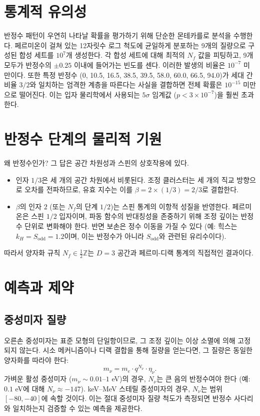 \documentclass[12pt,a4paper]{article}
\newcommand{\Sodd}{S_{\mathrm{odd}}}
\begin{document}
	\section{통계적 유의성}
	
	반정수 패턴이 우연히 나타날 확률을 평가하기 위해 단순한 몬테카를로 분석을 수행한다. 페르미온이 걸쳐 있는 12자릿수 로그 척도에 균일하게 분포하는 9개의 질량으로 구성된 합성 세트를 \(10^7\)개 생성한다. 각 합성 세트에 대해 최적의 \(N_f\) 값을 피팅하고, 9개 모두가 반정수의 \(\pm 0.25\) 이내에 들어가는 빈도를 센다. 이러한 발생의 비율은 \(10^{-7}\) 미만이다. 또한 특정 반정수 (0, 10.5, 16.5, 38.5, 39.5, 58.0, 60.0, 66.5, 94.0)가 세대 간 비율 \(3/2\)와 일치하는 엄격한 계층을 따른다는 사실을 결합하면 전체 확률은 \(10^{-15}\) 미만으로 떨어진다. 이는 입자 물리학에서 사용되는 \(5\sigma\) 임계값 (\(p < 3\times 10^{-7}\))을 훨씬 초과한다.
	
	\section{반정수 단계의 물리적 기원}
	
	왜 반정수인가? 그 답은 공간 차원성과 스핀의 상호작용에 있다.
	
	\begin{itemize}
		\item 인자 \(1/3\)은 세 개의 공간 차원에서 비롯된다. 조정 클러스터는 세 개의 직교 방향으로 오차를 전파하므로, 유효 지수는 이를 \(\beta = 2 \times (1/3) = 2/3\)로 결합한다.
		\item \(\beta\)의 인자 \(2\) (또는 \(N_f\)의 단계 \(1/2\))는 스핀 통계의 이항적 성질을 반영한다. 페르미온은 스핀 \(1/2\) 입자이며, 파동 함수의 반대칭성을 존중하기 위해 조정 깊이는 반정수 단위로 변화해야 한다. 반면 보손은 정수 이동을 가질 수 있다 (예: 힉스는 \(k_H = \Sodd = 1.2\)이며, 이는 반정수가 아니라 \(\Sodd\)와 관련된 유리수이다).
	\end{itemize}
	
	따라서 양자화 규칙 \(N_f \in \frac{1}{2}\mathbb{Z}\)는 \(D=3\) 공간과 페르미-디랙 통계의 직접적인 결과이다.
	
	\section{예측과 제약}
	
	\subsection{중성미자 질량}
	
	오른손 중성미자는 표준 모형의 단일항이므로, 그 조정 깊이는 이상 소멸에 의해 고정되지 않는다. 시소 메커니즘이나 디랙 결합을 통해 질량을 얻는다면, 그 질량은 동일한 양자화를 따라야 한다:
	\begin{equation}
		m_\nu = m_e \cdot q^{N_\nu} \cdot \eta_\nu.
	\end{equation}
	가벼운 활성 중성미자 (\(m_\nu \sim 0.01\)–\(1\) eV)의 경우, \(N_\nu\)는 큰 음의 반정수여야 한다 (예: \(0.1\) eV에 대해 \(N_\nu \approx -147\)). keV–MeV 스테릴 중성미자의 경우, \(N_\nu\)는 범위 \([-80, -40]\)에 속할 것이다. 이는 절대 중성미자 질량 척도가 측정되면 반정수 사다리와 일치하는지 검증할 수 있는 예측을 제공한다.
	
\end{document}
